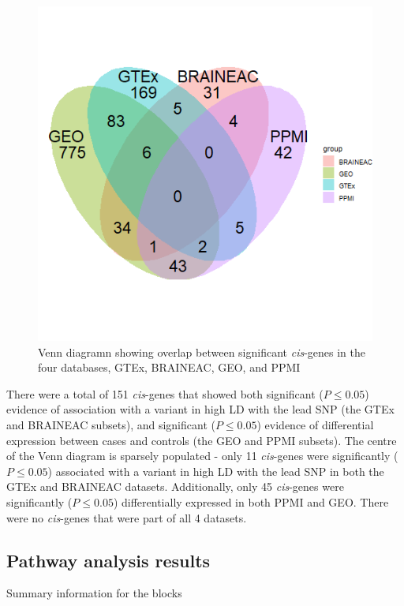 \documentclass{article}
\begin{document}
\newpage
\begin{figure}[h]
    \centering
    \includegraphics[width=1\linewidth]{Thesis/thesis images/vennsigcisgenes.png}
    \caption{Venn diagramn showing overlap between significant \textit{cis}-genes in the four databases, GTEx, BRAINEAC, GEO, and PPMI}
    \label{fig:enter-label}
\end{figure}

There were a total of 151 \textit{cis}-genes that showed both significant ($P \leq 0.05$) evidence of association with a variant in high LD with the lead SNP (the GTEx and BRAINEAC subsets), and significant ($P \leq 0.05$) evidence of differential expression between cases and controls (the GEO and PPMI subsets). The centre of the Venn diagram is sparsely populated - only 11 \textit{cis}-genes were significantly ($P \leq 0.05$) associated with a variant in high LD with the lead SNP in both the GTEx and BRAINEAC datasets. Additionally, only 45 \textit{cis}-genes were significantly ($P \leq 0.05$) differentially expressed in both PPMI and GEO. There were no \textit{cis}-genes that were part of all 4 datasets. 
\newpage
\subsection{Pathway analysis results}
Summary information for the blocks
\end{document}
